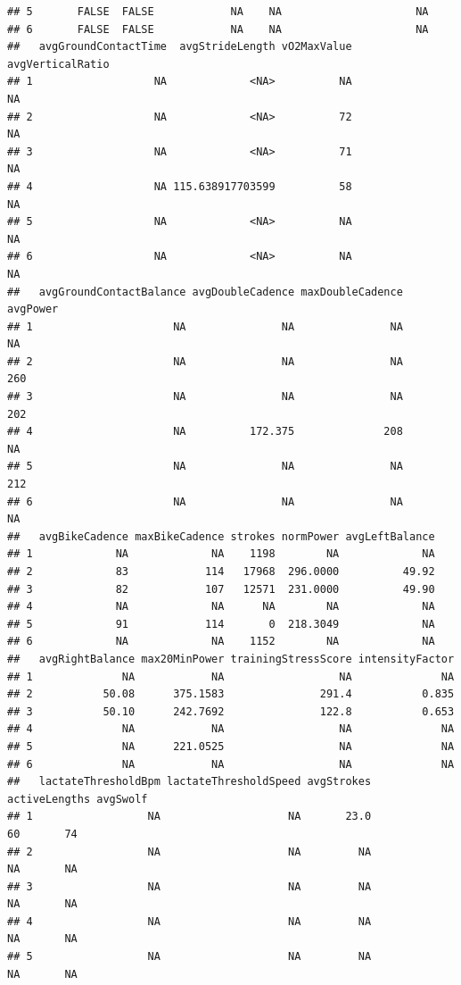 \documentclass[
]{book}
\begin{document}
\begin{verbatim}
## 5       FALSE  FALSE            NA    NA                     NA
## 6       FALSE  FALSE            NA    NA                     NA
##   avgGroundContactTime  avgStrideLength vO2MaxValue avgVerticalRatio
## 1                   NA             <NA>          NA               NA
## 2                   NA             <NA>          72               NA
## 3                   NA             <NA>          71               NA
## 4                   NA 115.638917703599          58               NA
## 5                   NA             <NA>          NA               NA
## 6                   NA             <NA>          NA               NA
##   avgGroundContactBalance avgDoubleCadence maxDoubleCadence avgPower
## 1                      NA               NA               NA       NA
## 2                      NA               NA               NA      260
## 3                      NA               NA               NA      202
## 4                      NA          172.375              208       NA
## 5                      NA               NA               NA      212
## 6                      NA               NA               NA       NA
##   avgBikeCadence maxBikeCadence strokes normPower avgLeftBalance
## 1             NA             NA    1198        NA             NA
## 2             83            114   17968  296.0000          49.92
## 3             82            107   12571  231.0000          49.90
## 4             NA             NA      NA        NA             NA
## 5             91            114       0  218.3049             NA
## 6             NA             NA    1152        NA             NA
##   avgRightBalance max20MinPower trainingStressScore intensityFactor
## 1              NA            NA                  NA              NA
## 2           50.08      375.1583               291.4           0.835
## 3           50.10      242.7692               122.8           0.653
## 4              NA            NA                  NA              NA
## 5              NA      221.0525                  NA              NA
## 6              NA            NA                  NA              NA
##   lactateThresholdBpm lactateThresholdSpeed avgStrokes activeLengths avgSwolf
## 1                  NA                    NA       23.0            60       74
## 2                  NA                    NA         NA            NA       NA
## 3                  NA                    NA         NA            NA       NA
## 4                  NA                    NA         NA            NA       NA
## 5                  NA                    NA         NA            NA       NA

\end{verbatim}
\end{document}
